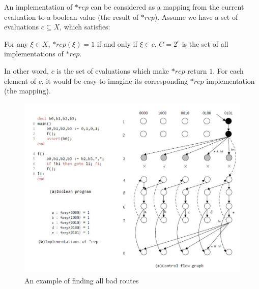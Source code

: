 An implementation of $*rep$ can be considered as a mapping from the current evaluation to a boolean value (the result of $*rep$). Assume we have a set of evaluations $c \subseteq X$, which satisfies:
\begin{definition}
For any $\xi \in X$, $*rep(\xi) = 1$ if and only if $\xi \in c$. $C = 2^{c}$ is the set of all implementations of $*rep$.
\end{definition}
In other word, $c$ is the set of evaluations which make $*rep$ return $1$. For each element of $c$, it would be easy to imagine its corresponding $*rep$ implementation (the mapping).

\begin{figure}
\centering
\includegraphics[width=5in,height=3.5in]{img/Fig3-2.jpg}
\caption{An example of finding all bad routes}
\label{fig:FBR}
\end{figure}

